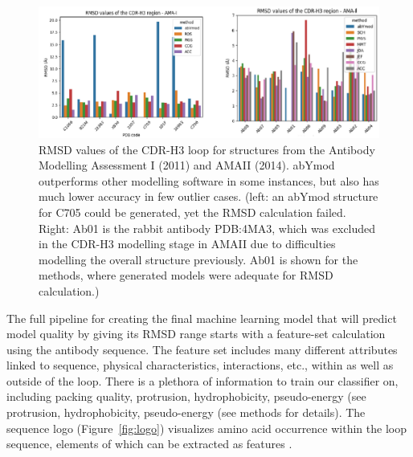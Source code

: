 \documentclass[12pt]{article}
\begin{document}
\begin{figure}
  \centering
  \includegraphics[width=\linewidth]{AMA.eps}
  \caption {RMSD values of the CDR-H3 loop for structures from the
    Antibody Modelling Assessment I (2011) and AMAII (2014). abYmod
    outperforms other modelling software in some instances, but also
    has much lower accuracy in few outlier cases. (left: an abYmod
    structure for C705 could be generated, yet the RMSD calculation
    failed. Right: Ab01 is the rabbit antibody PDB:4MA3, which was
    excluded in the CDR-H3 modelling stage in AMAII due to
    difficulties modelling the overall structure previously. Ab01 is
    shown for the methods, where generated models were adequate for
    RMSD calculation.)}
  \label{fig:AMA}
\end{figure}

The full pipeline for creating the final machine learning model that
will predict model quality by giving its RMSD range starts with a
feature-set calculation using the antibody sequence. The feature set
includes many different attributes linked to sequence, physical
characteristics, interactions, etc., within as well as outside of the
loop. There is a plethora of information to train our classifier on,
including packing quality, protrusion, hydrophobicity, pseudo-energy
(see protrusion, hydrophobicity, pseudo-energy (see methods for
details). The sequence logo (Figure~\ref{fig:logo}) visualizes amino acid
occurrence within the loop sequence, elements of which can be
extracted as features \cite{Thomsen2012,Shaner1993}.
\end{document}
